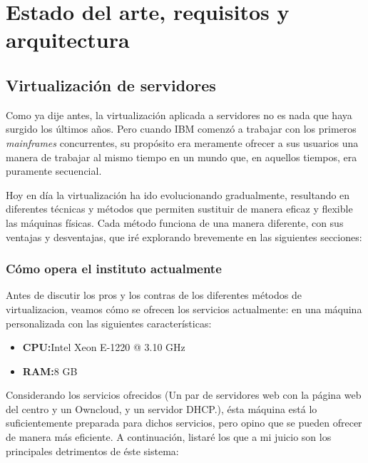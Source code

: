 \chapter[Estado del arte]{Estado del arte, requisitos y arquitectura}
\label{sec:state_of_art}

\section{Virtualización de servidores}
\label{subsec:virt_servers}

Como ya dije antes, la virtualización aplicada a servidores no es nada que haya surgido los últimos años. Pero cuando IBM comenzó a trabajar con los primeros \emph{mainframes} concurrentes, su propósito era meramente ofrecer a sus usuarios una manera de trabajar al mismo tiempo en un mundo que, en aquellos tiempos, era puramente secuencial.

Hoy en día la virtualización ha ido evolucionando gradualmente, resultando en diferentes técnicas y métodos que permiten sustituir de manera eficaz y flexible las máquinas físicas. Cada método funciona de una manera diferente, con sus ventajas y desventajas, que iré explorando brevemente en las siguientes secciones:

\subsection{Cómo opera el instituto actualmente}
\label{subsubsec:virt_des}

Antes de discutir los pros y los contras de los diferentes métodos de virtualizacion, veamos cómo se ofrecen los servicios actualmente: en una máquina personalizada con las siguientes características:

\begin{itemize}
    \item \textbf{CPU:\@ }Intel Xeon E-1220 @ 3.10 GHz
    \item \textbf{RAM:\@ }8 GB
\end{itemize}

Considerando los servicios ofrecidos (Un par de servidores web con la página web del centro y un Owncloud, y un servidor DHCP.), ésta máquina está lo suficientemente preparada para dichos servicios, pero opino que se pueden ofrecer de manera más eficiente. A continuación, listaré los que a mi juicio son los principales detrimentos de éste sistema:

